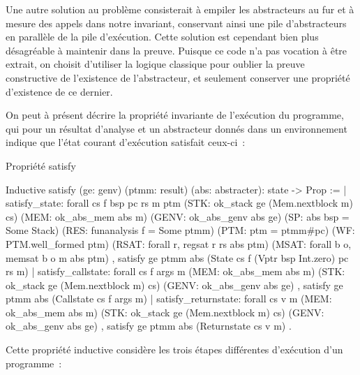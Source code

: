 \documentclass{article}
\begin{document}
Une autre solution au problème consisterait à empiler les abstracteurs au fur
et à mesure des appels dans notre invariant, conservant ainsi une pile
d'abstracteurs en parallèle de la pile d'exécution. Cette solution est
cependant bien plus désagréable à maintenir dans la preuve. Puisque ce code n'a
pas vocation à être extrait, on choisit d'utiliser la logique classique pour
oublier la preuve constructive de l'existence de l'abstracteur, et seulement
conserver une propriété d'existence de ce dernier.

On peut à présent décrire la propriété invariante de l'exécution du programme,
qui pour un résultat d'analyse et un abstracteur donnés dans un environnement
indique que l'état courant d'exécution satisfait ceux-ci~:

\begin{coqcode}
\caption{Propriété satisfy}
\begin{english}
\begin{coq}
Inductive satisfy (ge: genv) (ptmm: result) (abs: abstracter): state -> Prop :=
| satisfy_state: forall cs f bsp pc rs m ptm
  (STK:   ok_stack ge (Mem.nextblock m) cs)
  (MEM:   ok_abs_mem abs m)
  (GENV:  ok_abs_genv abs ge)
  (SP:    abs bsp = Some Stack)
  (RES:   funanalysis f = Some ptmm)
  (PTM:   ptm = ptmm#pc)
  (WF:    PTM.well_formed ptm)
  (RSAT:  forall r, regsat r rs abs ptm)
  (MSAT:  forall b o, memsat b o m abs ptm)
  ,
  satisfy ge ptmm abs (State cs f (Vptr bsp Int.zero) pc rs m)
| satisfy_callstate: forall cs f args m
  (MEM:   ok_abs_mem abs m)
  (STK:   ok_stack ge (Mem.nextblock m) cs)
  (GENV:  ok_abs_genv abs ge)
  ,
  satisfy ge ptmm abs (Callstate cs f args m)
| satisfy_returnstate: forall cs v m
  (MEM:   ok_abs_mem abs m)
  (STK:   ok_stack ge (Mem.nextblock m) cs)
  (GENV:  ok_abs_genv abs ge)
  ,
  satisfy ge ptmm abs (Returnstate cs v m)
.
\end{coq}
\end{english}
\end{coqcode}

Cette propriété inductive considère les trois étapes différentes d'exécution
d'un programme~:
\end{document}
